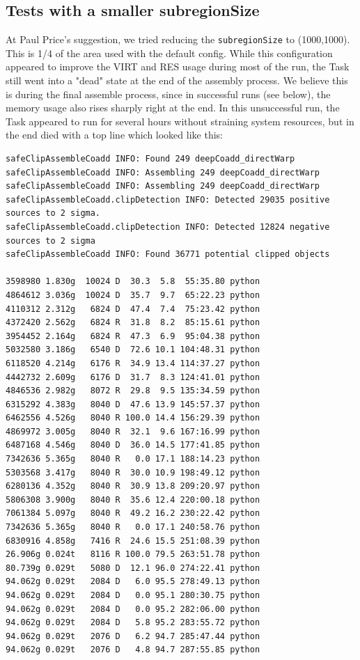 \documentclass[DM,toc]{lsstdoc}
\begin{document}
\subsection{Tests with a smaller subregionSize}
At Paul Price's suggestion, we tried reducing the {\tt\string subregionSize} to (1000,1000). This is 1/4 of the area used with the default config. While this configuration appeared to improve the VIRT and RES usage during most of the run, the Task still went into a "dead" state at the end of the assembly process. We believe this is during the final assemble process, since in successful runs (see below), the memory usage also rises sharply right at the end. In this unsuccessful run, the Task appeared to run for several hours without straining system resources, but in the end died with a top line which looked like this:

\begin{small}
\begin{verbatim}
safeClipAssembleCoadd INFO: Found 249 deepCoadd_directWarp
safeClipAssembleCoadd INFO: Assembling 249 deepCoadd_directWarp
safeClipAssembleCoadd INFO: Assembling 249 deepCoadd_directWarp
safeClipAssembleCoadd.clipDetection INFO: Detected 29035 positive sources to 2 sigma.
safeClipAssembleCoadd.clipDetection INFO: Detected 12824 negative sources to 2 sigma
safeClipAssembleCoadd INFO: Found 36771 potential clipped objects

3598980 1.830g  10024 D  30.3  5.8  55:35.80 python
4864612 3.036g  10024 D  35.7  9.7  65:22.23 python
4110312 2.312g   6824 D  47.4  7.4  75:23.42 python
4372420 2.562g   6824 R  31.8  8.2  85:15.61 python
3954452 2.164g   6824 R  47.3  6.9  95:04.38 python
5032580 3.186g   6540 D  72.6 10.1 104:48.31 python
6118520 4.214g   6176 R  34.9 13.4 114:37.27 python
4442732 2.609g   6176 D  31.7  8.3 124:41.01 python
4846536 2.982g   8072 R  29.8  9.5 135:34.59 python
6315292 4.383g   8040 D  47.6 13.9 145:57.37 python
6462556 4.526g   8040 R 100.0 14.4 156:29.39 python
4869972 3.005g   8040 R  32.1  9.6 167:16.99 python
6487168 4.546g   8040 D  36.0 14.5 177:41.85 python
7342636 5.365g   8040 R   0.0 17.1 188:14.23 python
5303568 3.417g   8040 R  30.0 10.9 198:49.12 python
6280136 4.352g   8040 R  30.9 13.8 209:20.97 python
5806308 3.900g   8040 R  35.6 12.4 220:00.18 python
7061384 5.097g   8040 R  49.2 16.2 230:22.42 python
7342636 5.365g   8040 R   0.0 17.1 240:58.76 python
6830916 4.858g   7416 R  24.6 15.5 251:08.39 python
26.906g 0.024t   8116 R 100.0 79.5 263:51.78 python
80.739g 0.029t   5080 D  12.1 96.0 274:22.41 python
94.062g 0.029t   2084 D   6.0 95.5 278:49.13 python
94.062g 0.029t   2084 D   0.0 95.1 280:30.75 python
94.062g 0.029t   2084 D   0.0 95.2 282:06.00 python
94.062g 0.029t   2084 D   5.8 95.2 283:55.72 python
94.062g 0.029t   2076 D   6.2 94.7 285:47.44 python
94.062g 0.029t   2076 D   4.8 94.7 287:55.85 python

\end{verbatim}
\end{small}
\end{document}
